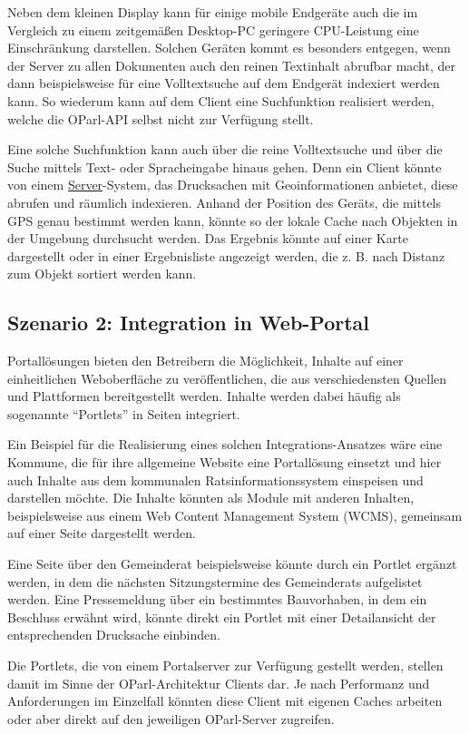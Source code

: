 \documentclass[,a4paper]{article}
\begin{document}
Neben dem kleinen Display kann für einige mobile Endgeräte auch die im
Vergleich zu einem zeitgemäßen Desktop-PC geringere CPU-Leistung eine
Einschränkung darstellen. Solchen Geräten kommt es besonders entgegen,
wenn der Server zu allen Dokumenten auch den reinen Textinhalt abrufbar
macht, der dann beispielsweise für eine Volltextsuche auf dem Endgerät
indexiert werden kann. So wiederum kann auf dem Client eine Suchfunktion
realisiert werden, welche die OParl-API selbst nicht zur Verfügung
stellt.

Eine solche Suchfunktion kann auch über die reine Volltextsuche und über
die Suche mittels Text- oder Spracheingabe hinaus gehen. Denn ein Client
könnte von einem \hyperref[server]{Server}-System, das Drucksachen mit
Geoinformationen anbietet, diese abrufen und räumlich indexieren. Anhand
der Position des Geräts, die mittels GPS genau bestimmt werden kann,
könnte so der lokale Cache nach Objekten in der Umgebung durchsucht
werden. Das Ergebnis könnte auf einer Karte dargestellt oder in einer
Ergebnisliste angezeigt werden, die z. B. nach Distanz zum Objekt
sortiert werden kann.

\subsection{Szenario 2: Integration in
Web-Portal}\label{szenarioux5fwebux5fportal}

Portallösungen bieten den Betreibern die Möglichkeit, Inhalte auf einer
einheitlichen Weboberfläche zu veröffentlichen, die aus verschiedensten
Quellen und Plattformen bereitgestellt werden. Inhalte werden dabei
häufig als sogenannte ``Portlets'' in Seiten integriert.

Ein Beispiel für die Realisierung eines solchen Integrations-Ansatzes
wäre eine Kommune, die für ihre allgemeine Website eine Portallösung
einsetzt und hier auch Inhalte aus dem kommunalen Ratsinformationssystem
einspeisen und darstellen möchte. Die Inhalte könnten als Module mit
anderen Inhalten, beispielsweise aus einem Web Content Management System
(WCMS), gemeinsam auf einer Seite dargestellt werden.

Eine Seite über den Gemeinderat beispielsweise könnte durch ein Portlet
ergänzt werden, in dem die nächsten Sitzungstermine des Gemeinderats
aufgelistet werden. Eine Pressemeldung über ein bestimmtes Bauvorhaben,
in dem ein Beschluss erwähnt wird, könnte direkt ein Portlet mit einer
Detailansicht der entsprechenden Drucksache einbinden.

Die Portlets, die von einem Portalserver zur Verfügung gestellt werden,
stellen damit im Sinne der OParl-Architektur Clients dar. Je nach
Performanz und Anforderungen im Einzelfall könnten diese Client mit
eigenen Caches arbeiten oder aber direkt auf den jeweiligen OParl-Server
zugreifen.
\end{document}

